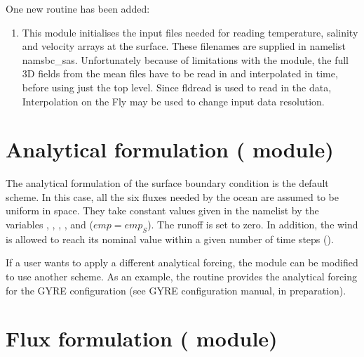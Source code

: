 One new routine has been added:

\begin{enumerate}
\item  {}
       This module initialises the input files needed for reading temperature, salinity and velocity arrays at the surface.
       These filenames are supplied in namelist namsbc{\_}sas.  Unfortunately because of limitations with the  module,
       the full 3D fields from the mean files have to be read in and interpolated in time, before using just the top level.
       Since fldread is used to read in the data, Interpolation on the Fly may be used to change input data resolution.
\end{enumerate}

\section  [Analytical formulation (\textit{sbcana}) ]
		{Analytical formulation ( module) }
\label{SBC_ana}


The analytical formulation of the surface boundary condition is the default scheme.
In this case, all the six fluxes needed by the ocean are assumed to 
be uniform in space. They take constant values given in the namelist 
 by the variables , , , 
, and  ($\textit{emp}=\textit{emp}_S$). The runoff is set to zero. 
In addition, the wind is allowed to reach its nominal value within a given number 
of time steps ().

If a user wants to apply a different analytical forcing, the  
module can be modified to use another scheme. As an example, 
the  routine provides the analytical forcing for the 
GYRE configuration (see GYRE configuration manual, in preparation).


\section  [Flux formulation (\textit{sbcflx}) ]
		{Flux formulation ( module) }
\label{SBC_flx}


